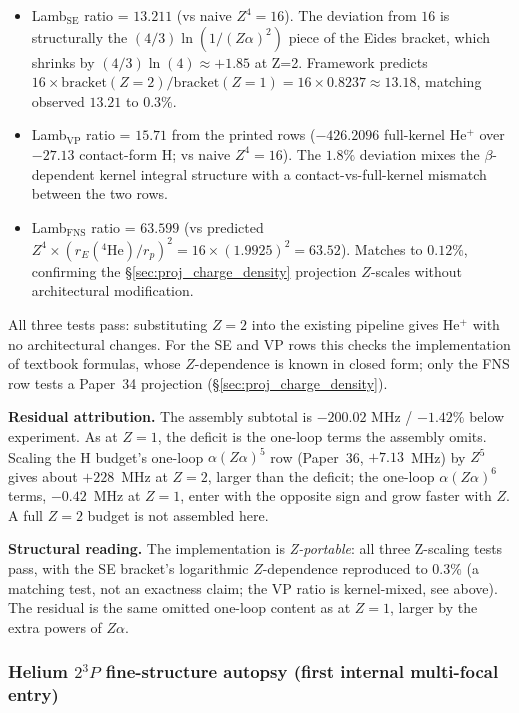 \documentclass[11pt]{article}
\begin{document}
\begin{itemize}\setlength\itemsep{0pt}
\item Lamb$_\text{SE}$ ratio = $13.211$ (vs naive $Z^4 = 16$).  The
deviation from $16$ is structurally the $(4/3) \ln(1/(Z\alpha)^2)$
piece of the Eides bracket, which shrinks by $(4/3) \ln(4) \approx
+1.85$ at Z=2.  Framework predicts $16 \times \text{bracket}(Z=2)/
\text{bracket}(Z=1) = 16 \times 0.8237 \approx 13.18$, matching observed
$13.21$ to $0.3\%$.

\item Lamb$_\text{VP}$ ratio = $15.71$ from the printed rows
($-426.2096$ full-kernel He$^+$ over $-27.13$ contact-form H; vs naive
$Z^4 = 16$).  The $1.8\%$ deviation mixes the $\beta$-dependent kernel
integral structure with a contact-vs-full-kernel mismatch between the
two rows.

\item Lamb$_\text{FNS}$ ratio = $63.599$ (vs predicted $Z^4 \times
(r_E({}^4\text{He})/r_p)^2 = 16 \times (1.9925)^2 = 63.52$).
Matches to $0.12\%$, confirming the
\S\ref{sec:proj_charge_density} projection $Z$-scales without
architectural modification.
\end{itemize}

All three tests pass: substituting $Z=2$ into the existing pipeline
gives He$^+$ with no architectural changes.  For the SE and VP rows this
checks the implementation of textbook formulas, whose $Z$-dependence is
known in closed form; only the FNS row tests a Paper~34 projection
(\S\ref{sec:proj_charge_density}).

\textbf{Residual attribution.}  The assembly subtotal is
$-200.02$ MHz / $-1.42\%$ below experiment.  As at $Z=1$, the deficit
is the one-loop terms the assembly omits.  Scaling the H budget's
one-loop $\alpha(Z\alpha)^5$ row (Paper~36, $+7.13$~MHz) by $Z^5$ gives
about $+228$~MHz at $Z=2$, larger than the deficit; the one-loop
$\alpha(Z\alpha)^6$ terms, $-0.42$~MHz at $Z=1$, enter with the opposite
sign and grow faster with $Z$.  A full $Z=2$ budget is not assembled
here.

\textbf{Structural reading.}  The implementation is \emph{Z-portable}:
all three Z-scaling tests pass, with the SE bracket's logarithmic
$Z$-dependence reproduced to $0.3\%$ (a matching test, not an exactness
claim; the VP ratio is kernel-mixed, see above).  The residual is the
same omitted one-loop content as at $Z=1$, larger by the extra powers
of $Z\alpha$.

\subsubsection{Helium $2{}^3P$ fine-structure autopsy (first internal multi-focal entry)}
\label{sec:autopsy_he_2_3p}
\end{document}
